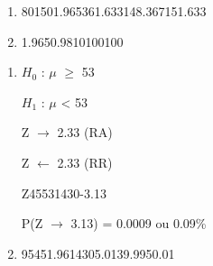 
\begin{question}
    
    \begin{enumerate}[label={\textbf{\alph*)}}]

        \item 
              \begin{formula1}
                {80}{150}{1.96}{5}{36}{1.633}{148.367}{151.633}
              \end{formula1}
        \item 
              
              \begin{formula6}
                {1.96}{5}{0.98}{10}{100}{100}
              \end{formula6}
    \end{enumerate}
\end{question}


\begin{question}
    
    \begin{enumerate}[label={\textbf{\alph*)}}]
        
        \item 
        
            $H_0$ : $\mu$ $\geq$ 53 

            $H_1$ : $\mu$ < 53 

            Z $\rightarrow$ 2.33 (RA)

            Z $\leftarrow$ 2.33 (RR)

            \begin{formula7}
                {Z}{45}{53}{14}{30}{-3.13}
            \end{formula7}

            P(Z $\rightarrow$ 3.13) = 0.0009 ou 0.09\%
        \item 

            \begin{formula1}
               {95}{45}{1.96}{14}{30}{5.01}{39.99}{50.01}
            \end{formula1}
            
    \end{enumerate}
\end{question}

